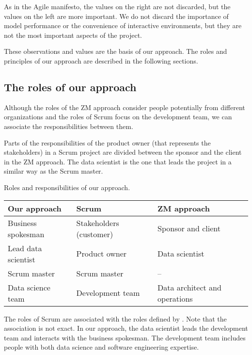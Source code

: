 As in the Agile manifesto, the values on the right are not discarded, but the values on the
left are more important.  We do not discard the importance of model performance or the
convenience of interactive environments, but they are not the most important aspects of the
project.

These observations and values are the basis of our approach.  The roles and principles of
our approach are described in the following sections.

\subsection{The roles of our approach}

Although the roles of the ZM approach consider people potentially from different
organizations and the roles of Scrum focus on the development team, we can associate the
responsibilities between them.

Parts of the responsibilities of the product owner (that represents the stakeholders) in a
Scrum project are divided between the sponsor and the client in the ZM approach.  The data
scientist is the one that leads the project in a similar way as the Scrum master.

\begin{tablebox}[label=tab:roles]{Roles and responsibilities of our approach.}
  \centering
  \begin{tabular}{>{\raggedright\arraybackslash}p{2.5cm}>{\raggedright\arraybackslash}p{2.5cm}>{\raggedright\arraybackslash}p{2.5cm}}
    \toprule
    \textbf{Our approach} & \textbf{Scrum} & \textbf{ZM approach} \\
    \midrule
    Business spokesman    & Stakeholders (customer) & Sponsor and client \\
    Lead data scientist   & Product owner           & Data scientist \\
    Scrum master          & Scrum master            & -- \\
    Data science team     & Development team        & Data architect and operations \\
    \bottomrule
  \end{tabular}
  \tcblower
  The roles of Scrum are associated with the roles defined by \textcite{Zumel2019}.
  Note that the association is not exact.
  In our approach, the data scientist leads the development team and interacts with the
  business spokesman.  The development team includes people with both data science and software
  engineering expertise.
\end{tablebox}

